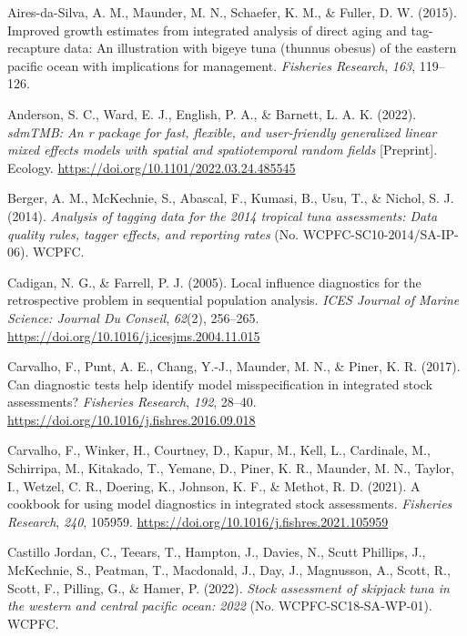 \documentclass[
  english,
  a4paper,
  a4paper,
  11pt]{SCreport}
\newlength{\cslhangindent}
\newenvironment{CSLReferences}[2] %
 {\begin{list}{}{%
  \setlength{\itemindent}{0pt}
  \setlength{\leftmargin}{0pt}
  \setlength{\parsep}{0pt}
  \ifodd #1
   \setlength{\leftmargin}{\cslhangindent}
   \setlength{\itemindent}{-1\cslhangindent}
  \fi
  \setlength{\itemsep}{#2\baselineskip}}}
 {\end{list}}
\begin{document}
\protect{}\label{refs}
\begin{CSLReferences}{1}{0}
Aires-da-Silva, A. M., Maunder, M. N., Schaefer, K. M., \& Fuller, D. W.
(2015). Improved growth estimates from integrated analysis of direct
aging and tag-recapture data: An illustration with bigeye tuna (thunnus
obesus) of the eastern pacific ocean with implications for management.
\emph{Fisheries Research}, \emph{163}, 119--126.

Anderson, S. C., Ward, E. J., English, P. A., \& Barnett, L. A. K.
(2022). \emph{{sdmTMB}: An r package for fast, flexible, and
user-friendly generalized linear mixed effects models with spatial and
spatiotemporal random fields} {[}Preprint{]}. Ecology.
\url{https://doi.org/10.1101/2022.03.24.485545}

Berger, A. M., McKechnie, S., Abascal, F., Kumasi, B., Usu, T., \&
Nichol, S. J. (2014). \emph{Analysis of tagging data for the 2014
tropical tuna assessments: Data quality rules, tagger effects, and
reporting rates} (No. {WCPFC}-{SC}10-2014/{SA}-{IP}-06). WCPFC.

Cadigan, N. G., \& Farrell, P. J. (2005). Local influence diagnostics
for the retrospective problem in sequential population analysis.
\emph{{ICES} Journal of Marine Science: Journal Du Conseil},
\emph{62}(2), 256--265.
\url{https://doi.org/10.1016/j.icesjms.2004.11.015}

Carvalho, F., Punt, A. E., Chang, Y.-J., Maunder, M. N., \& Piner, K. R.
(2017). Can diagnostic tests help identify model misspecification in
integrated stock assessments? \emph{Fisheries Research}, \emph{192},
28--40. \url{https://doi.org/10.1016/j.fishres.2016.09.018}

Carvalho, F., Winker, H., Courtney, D., Kapur, M., Kell, L., Cardinale,
M., Schirripa, M., Kitakado, T., Yemane, D., Piner, K. R., Maunder, M.
N., Taylor, I., Wetzel, C. R., Doering, K., Johnson, K. F., \& Methot,
R. D. (2021). A cookbook for using model diagnostics in integrated stock
assessments. \emph{Fisheries Research}, \emph{240}, 105959.
\url{https://doi.org/10.1016/j.fishres.2021.105959}

Castillo Jordan, C., Teears, T., Hampton, J., Davies, N., Scutt
Phillips, J., McKechnie, S., Peatman, T., Macdonald, J., Day, J.,
Magnusson, A., Scott, R., Scott, F., Pilling, G., \& Hamer, P. (2022).
\emph{Stock assessment of skipjack tuna in the western and central
pacific ocean: 2022} (No. {WCPFC}-{SC}18-{SA}-{WP}-01). WCPFC.


\end{CSLReferences}
\end{document}
